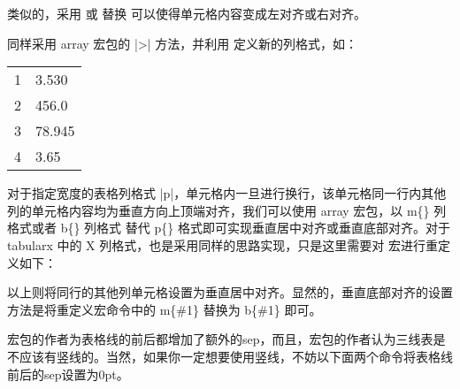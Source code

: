类似的，采用  或
 替换 可以使得单元格内容变成左对齐或右对齐。



同样采用 array 宏包的 |>| 方法，并利用
 定义新的列格式，如：

\begin{texinlist}
\usepackage{array,tabularx}  %
\begin{tabularx}{\linewidth}{ZZ}
\hline

1  &  3.530  \\
2  &  456.0  \\
3  &  78.945 \\
4  &  3.65   \\
\hline
\end{tabularx}
\end{texinlist}



对于指定宽度的表格列格式
|p{}|，单元格内一旦进行换行，该单元格同一行内其他列的单元格内容均为垂直方向上顶端对齐，我们可以使用
array 宏包，以 m\{\} 列格式或者 b\{\} 列格式 替代 p\{\}
格式即可实现垂直居中对齐或垂直底部对齐。对于 tabularx 中的 X
列格式，也是采用同样的思路实现，只是这里需要对
 宏进行重定义如下：

\begin{texinlist}
\usepackage{array,tabularx}   %
\renewcommand{\tabularxcolumn}[1]{m{#1}}  %
\end{texinlist}

以上则将同行的其他列单元格设置为垂直居中对齐。显然的，垂直底部对齐的设置方法是将重定义宏命令中的
m\{\#1\} 替换为 b\{\#1\} 即可。



宏包的作者为表格线的前后都增加了额外的sep，而且，宏包的作者认为三线表是不应该有竖线的。当然，如果你一定想要使用竖线，不妨以下面两个命令将表格线前后的sep设置为0pt。

\begin{texinlist}
\usepackage{booktabs} %
\setlength{\belowrulesep}{0pt}
\setlength{\aboverulesep}{0pt}
\end{texinlist}


